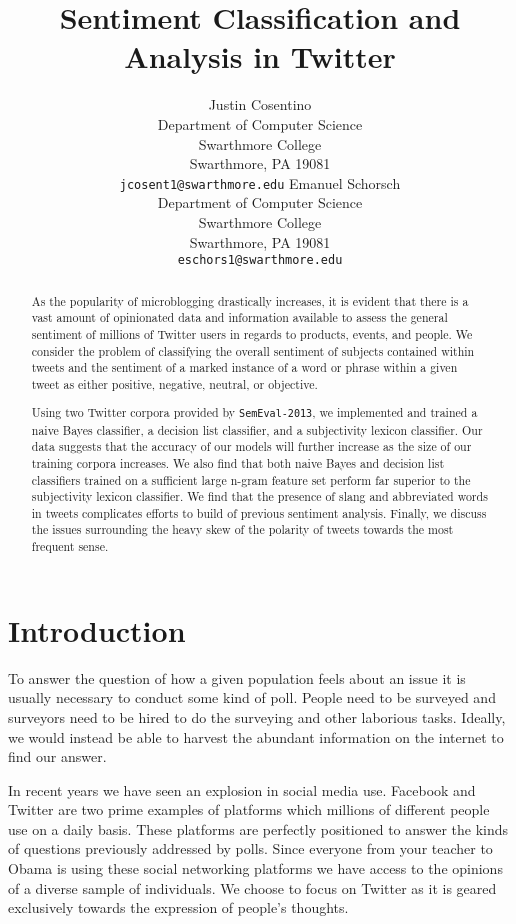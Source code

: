 \documentclass[11pt]{article}
\title{Sentiment Classification and Analysis in Twitter}
\author{Justin Cosentino\\
  Department of Computer Science\\
  Swarthmore College\\
  Swarthmore, PA 19081\\
  {\tt jcosent1@swarthmore.edu}  
  \And                            
  Emanuel Schorsch\\                 
  Department of Computer Science\\
  Swarthmore College\\
  Swarthmore, PA 19081\\
  {\tt eschors1@swarthmore.edu}}
\date{}
\begin{document}
\maketitle
\begin{abstract}
As the popularity of microblogging drastically increases, it is evident that there is a vast amount of opinionated data and information available to assess the general sentiment of millions of Twitter users in regards to products, events, and people. We consider the problem of classifying the overall sentiment of subjects contained within tweets and the sentiment of a marked instance of a word or phrase within a given tweet as either positive, negative, neutral, or objective. 

Using two Twitter corpora provided by {\tt SemEval-2013}, we implemented and trained a naive Bayes classifier, a decision list classifier, and a subjectivity lexicon classifier. Our data suggests that the accuracy of our models will further increase as the size of our training corpora increases. We also find that both naive Bayes and decision list classifiers trained on a sufficient large n-gram feature set perform far superior to the subjectivity lexicon classifier. We find that the presence of slang and abbreviated words in tweets complicates efforts to build of previous sentiment analysis. Finally, we discuss the issues surrounding the heavy skew of the polarity of tweets towards the most frequent sense.
\end{abstract}

\section{Introduction}
To answer the question of how a given population feels about an issue it is usually necessary to conduct some kind of poll. People need to be surveyed and surveyors need to be hired to do the surveying and other laborious tasks. Ideally,  we would instead be able to harvest the abundant information on the internet to find our answer. 

In recent years we have seen an explosion in social media use. Facebook and Twitter are two prime examples of platforms which millions of different people use on a daily basis. These platforms are perfectly positioned to answer the kinds of questions previously addressed by polls. Since everyone from your teacher to Obama is using these social networking platforms we have access to the opinions of a diverse sample of individuals. We choose to focus on Twitter as it is geared exclusively towards the expression of people's thoughts.  
\end{document}

